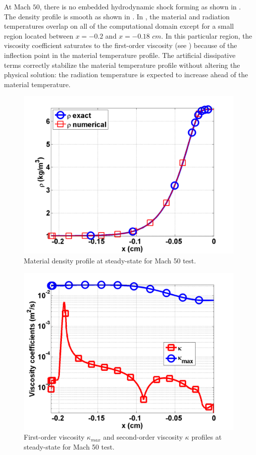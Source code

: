 At Mach $50$, there is no embedded hydrodynamic shock forming as shown in . The density profile is smooth as shown in . In , the material and radiation temperatures overlap on all of the computational domain except for a small region located between $x=-0.2$ and $x=-0.18$ $cm$. In this particular region, the viscosity coefficient saturates to the first-order viscosity (see ) because of the inflection point in the material temperature profile. The artificial dissipative terms correctly stabilize the material temperature profile without altering the physical solution: the radiation temperature is expected to increase ahead of the material temperature.
\begin{figure}[H]
                \centering
                \includegraphics[width=\textwidth]{figures/Mach_50_nel_1000_density.png}
        \caption{Material density profile at steady-state for Mach 50 test.}\label{fig:Mach50_density}
\end{figure}
\begin{figure}[H]
                \centering
                \includegraphics[width=\textwidth]{figures/Mach_50_nel_1000_viscosity.png}
        \caption{First-order viscosity $\kappa_{max}$ and second-order viscosity $\kappa$ profiles at steady-state for Mach 50 test.}\label{fig:Mach50_viscosity}
\end{figure}

